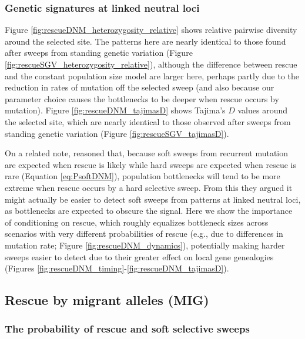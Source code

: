 \documentclass[]{article}
\begin{document}
\subsubsection*{Genetic signatures at linked neutral loci}

Figure \ref{fig:rescueDNM_heterozygosity_relative} shows relative pairwise diversity around the selected site.
The patterns here are nearly identical to those found after sweeps from standing genetic variation (Figure \ref{fig:rescueSGV_heterozygosity_relative}), although the difference between rescue and the constant population size model are larger here, perhaps partly due to the reduction in rates of mutation off the selected sweep (and also because our parameter choice causes the bottlenecks to be deeper when rescue occurs by mutation).
Figure \ref{fig:rescueDNM_tajimasD} shows Tajima's $D$ values around the selected site, which are nearly identical to those observed after sweeps from standing genetic variation (Figure \ref{fig:rescueSGV_tajimasD}).

On a related note, \cite{wilson2017soft} reasoned that, because soft sweeps from recurrent mutation are expected when rescue is likely while hard sweeps are expected when rescue is rare (Equation \ref{eq:PsoftDNM}), population bottlenecks will tend to be more extreme when rescue occurs by a hard selective sweep.
From this they argued it might actually be easier to detect soft sweeps from patterns at linked neutral loci, as bottlenecks are expected to obscure the signal.
Here we show the importance of conditioning on rescue, which roughly equalizes bottleneck sizes across scenarios with very different probabilities of rescue (e.g., due to differences in mutation rate; Figure \ref{fig:rescueDNM_dynamics}), potentially making harder sweeps easier to detect due to their greater effect on local gene genealogies (Figures \ref{fig:rescueDNM_timing}-\ref{fig:rescueDNM_tajimasD}).

\subsection*{Rescue by migrant alleles (MIG)}
\label{sec:rescue_forward_mig_main}

\subsubsection*{The probability of rescue and soft selective sweeps}
\end{document}
